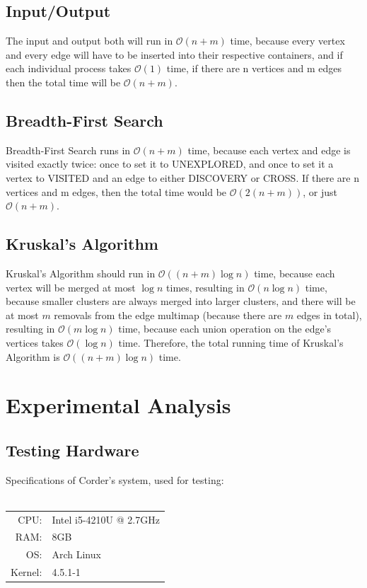\documentclass[titlepage]{article}
\begin{document}
\begin{multicols*}{2}
			\subsection{Input/Output}
                        The input and output both will run in $\mathcal{O}(n+m)$ time, because every vertex and every edge will have to be inserted into their respective containers, and if each individual process takes $\mathcal{O}(1)$ time, if there are n vertices and m edges then the total time will be $\mathcal{O}(n+m)$.
			\subsection{Breadth-First Search}
                        Breadth-First Search runs in $\mathcal{O}(n+m)$ time, because each vertex and edge is visited exactly twice: once to set it to UNEXPLORED, and once to set it a vertex to VISITED and an edge to either DISCOVERY or CROSS. If there are n vertices and m edges, then the total time would be $\mathcal{O}(2(n+m))$, or just $\mathcal{O}(n+m)$.
	               \subsection{Kruskal's Algorithm}
                Kruskal's Algorithm should run in $\mathcal{O}((n+m)\log{n})$ time, because each vertex will be merged at most $\log{n}$ times, resulting in $\mathcal{O}(n\log{n})$ time, because smaller clusters are always merged into larger clusters, and there will be at most $m$ removals from the edge multimap (because there are $m$ edges in total), resulting in $\mathcal{O}(m\log{n})$ time, because each union operation on the edge's vertices takes $\mathcal{O}(\log{n})$ time. Therefore, the total running time of Kruskal's Algorithm is $\mathcal{O}((n+m)\log{n})$ time.
        \section{Experimental Analysis}
            \subsection{Testing Hardware}
                Specifications of Corder's system, used for testing: \\ \\
                \begin{tabular}{r l}
                CPU:    & Intel i5-4210U @ 2.7GHz \\
                RAM:    & 8GB \\
                OS:     & Arch Linux \\
                Kernel: & 4.5.1-1 \\
                \end{tabular} \\ \\

\end{multicols*}
\end{document}

